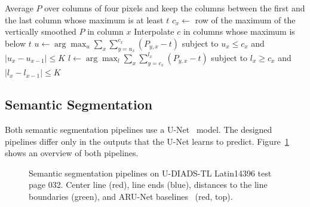 \begin{algorithm}[htbp]
    \small
    \caption{\Gls{dp} seam for one detected line, adapted from the medial and separating seams of~\cite{saabni2014textline, arvanitopoulos2014seamcarving}}
    \label{alg:dp-seam}
    Average \(P\) over columns of four pixels and keep the columns between the first and the last column whose maximum is at least \(t\)\;
    \(c_x \leftarrow\) row of the maximum of the vertically smoothed \(P\) in column \(x\)\;
    Interpolate \(c\) in columns whose maximum is below \(t\)\;
    \(u \leftarrow \arg\max_{u} \sum_{x}\sum_{y=u_x}^{c_x} (P_{y,x}-t)\) subject to \(u_x \le c_x\) and \(|u_x-u_{x-1}| \le K\)\;
    \(l \leftarrow \arg\max_{l} \sum_{x}\sum_{y=c_x}^{l_x} (P_{y,x}-t)\) subject to \(l_x \ge c_x\) and \(|l_x-l_{x-1}| \le K\)\;
    \;
\end{algorithm}


\subsection{Semantic Segmentation}
\label{sec:meth-segmentation}\label{sec:tls-methods}\label{sec:rq3-center-line}

Both semantic segmentation pipelines use a U-Net~\cite{DBLP:journals/corr/RonnebergerFB15} model. The designed pipelines differ only in the outputs that the U-Net learns to predict. Figure~\ref{fig:semantic-method} shows an overview of both pipelines.

\begin{figure}[htbp]
    \centering
    \resizebox{\textwidth}{!}{}
    \caption{Semantic segmentation pipelines on U-DIADS-TL Latin14396 test page 032. Center line (red), line ends (blue), distances to the line boundaries (green), and ARU-Net baselines~\cite{gruning2019arunet} (red, top).}
    \label{fig:semantic-method}
\end{figure}

